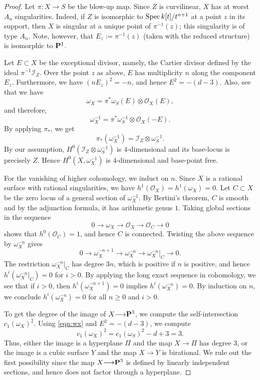 \documentclass[12pt,reqno]{amsart}
\renewcommand{\to}{{\longrightarrow}}
\numberwithin{equation}{section}
\renewcommand{\O}{\mathcal O}
\begin{document}
\begin{proof}
  Let $\pi \colon X \to S$ be the blow-up map.
  Since $Z$ is curvilinear, $X$ has at worst $A_n$ singularities.
  Indeed, if $Z$ is isomorphic to $\spec k[t]/t^{n+1}$ at a point $z$ in its support, then $X$ is singular at a unique point of $\pi^{-1}(z)$; this singularity is of type $A_n$.
  Note, however, that $E_z := \pi^{-1}(z)$ (taken with the reduced structure) is isomorphic to $\P^1$.
  
  Let $E \subset X$ be the exceptional divisor, namely, the Cartier divisor defined by the ideal $\pi^{-1}\mathcal I_Z$.
  Over the point $z$ as above, $E$ has multiplicity $n$ along the component $E_z$.
  Furthermore, we have $(nE_z)^2 = -n$, and hence $E^2 = -(d-3)$.
  Also, see that we have
  \begin{equation}\label{eqn:wx}
    \omega_X = \pi^* \omega_{S} (E) \otimes \O_X(E),
  \end{equation}
  and therefore,
  \[ \omega_X^{-1} = \pi^* \omega^{-1}_{S} \otimes \O_X(-E).\]
  By applying $\pi_*$, we get
  \[ \pi_* \left( \omega_X^{-1} \right) = \mathcal I_Z \otimes \omega_S^{-1}.\]
  By our assumption, $H^0\left(\mathcal I_Z \otimes \omega_S^{-1}\right)$ is $4$-dimensional and its base-locus is precisely $Z$.
  Hence $H^0\left( X, \omega_X^{-1} \right)$ is $4$-dimensional and base-point free.

  For the vanishing of higher cohomology, we induct on $n$.
  Since $X$ is a rational surface with rational singularities, we have $h^1(\O_X) = h^1(\omega_X) = 0$.
  Let $C \subset X$ be the zero locus of a general section of $\omega_X^{-1}$.
  By Bertini's theorem, $C$ is smooth and by the adjunction formula, it has arithmetic genus $1$.
  Taking global sections in the sequence
  \[ 0 \to \omega_X \to \O_X \to \O_C \to 0\]
  shows that $h^0(\O_C) = 1$, and hence $C$ is connected.
  Twisting the above sequence by $\omega_X^{-n}$ gives
  \[ 0 \to \omega_X^{-n+1} \to \omega_X^{-n} \to \omega_X^{-n}|_C \to 0.\]
  The restriction $\omega_X^{-n}|_C$ has degree $3n$, which is positive if $n$ is positive, and hence $h^i\left(\omega_X^{-n}|_C\right) = 0$ for $i > 0$.
  By applying the long exact sequence in cohomology, we see that if $i > 0$, then $h^i(\omega_X^{-n+1}) = 0$ implies $h^i(\omega_X^{-n}) = 0$.
  By induction on $n$, we conclude $h^i(\omega_X^{-n}) = 0$ for all $n \geq 0$ and $i > 0$.
    
  To get the degree of the image of $X \to \P^3$, we compute the self-intersection $c_1(\omega_X)^2$.
  Using \eqref{eqn:wx} and $E^2 = -(d-3)$, we compute
  \[ c_1(\omega_X)^2 = c_1(\omega_{S})^2 - d + 3 = 3.\]
  Thus, either the image is a hyperplane $\Pi$ and the map $X \to \Pi$ has degree 3, or the image is a cubic surface $Y$ and the map $X \to Y$ is birational.
  We rule out the first possibility since the map $X \to \P^3$ is defined by linearly independent sections, and hence does not factor through a hyperplane.


\end{proof}
\end{document}
